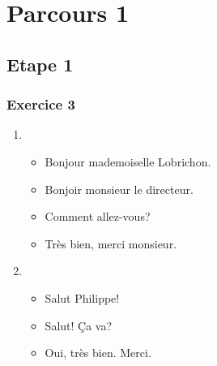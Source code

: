 \documentclass{article}
\begin{document}
\section{Parcours 1}

\subsection{Etape 1}

\subsubsection{Exercice 3}

\begin{enumerate}
  \item \begin{itemize}
    \item Bonjour mademoiselle Lobrichon.
    \item Bonjoir monsieur le directeur.
    \item Comment allez-vous?
    \item Très bien, merci monsieur.
  \end{itemize}
  \item \begin{itemize}
    \item Salut Philippe!
    \item Salut! \c Ca va?
    \item Oui, très bien. Merci.
  \end{itemize}
\end{enumerate}
\end{document}
